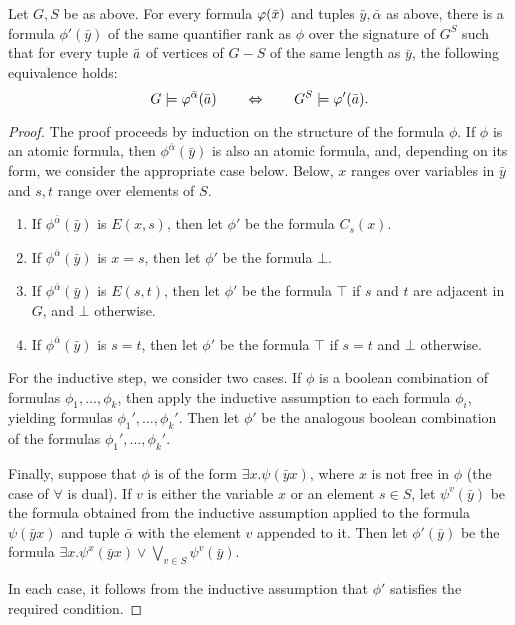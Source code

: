\begin{lemma}\label{lem:remove-s}Let $G,S$ be as above.	
For every formula $\varphi(\bar{x})$ and tuples $\bar y,\bar\alpha$ as above,
there is a formula $\phi'(\bar y)$ 
of the same quantifier rank as $\phi$ over the signature of $G^S$ 
 such that for every tuple $\bar{a}$ of vertices of $G-S$
 of the same length as $\bar y$,
the following equivalence holds:
$$G\models\varphi^{\bar\alpha}(\bar{a})\qquad\Leftrightarrow\qquad G^S\models\varphi'(\bar{a}).$$
\end{lemma}
\begin{proof}
The proof proceeds by induction on the structure of the formula $\phi$. If $\phi$ is an atomic formula,
then $\phi^{\bar \alpha}(\bar y)$ is also an atomic formula, and, depending on its form, 
we consider the appropriate case below. Below, $x$ ranges over variables in $\bar y$
and $s,t$ range over elements of $S$.
\begin{enumerate}
	\item If $\phi^{\bar \alpha}(\bar y)$ is $E(x,s)$, 
then let $\phi'$ be the formula $C_s(x)$.
\item If $\phi^{\bar \alpha}(\bar y)$ is $x=s$, then let $\phi'$
be the formula $\bot$. 
	\item If $\phi^{\bar \alpha}(\bar y)$ is $E(s,t)$, 
then let $\phi'$ be the formula $\top$ if $s$ and $t$ are adjacent in $G$, and $\bot$ otherwise. 
	\item If $\phi^{\bar \alpha}(\bar y)$ is $s=t$, 
then let $\phi'$ be the formula $\top$ if $s=t$ and $\bot$ otherwise. 
\end{enumerate}

For the inductive step, we consider two cases.
If $\phi$ is a boolean combination of formulas $\phi_1,\ldots,\phi_k$, then 
apply the inductive assumption to each formula $\phi_i$,
yielding formulas $\phi_1',\ldots,\phi_k'$. Then let $\phi'$ be the analogous boolean combination of the formulas $\phi_1',\ldots,\phi_k'$.

Finally, suppose that $\phi$ is of the form $\exists x.\psi(\bar y x)$, where $x$ is not free in $\phi$ (the case of $\forall$ is dual). If $v$ is either the variable $x$ 
or an element $s\in S$, 
let $\psi^v(\bar y)$ be the formula obtained from the inductive assumption applied to the formula $\psi(\bar y x)$ 
and tuple $\bar \alpha$ with the element $v$ appended to it.
Then let $\phi'(\bar y)$
be the formula $\exists x.\psi^x(\bar yx)\lor \bigvee_{v\in S}\psi^v(\bar y)$.

In each case, it follows from the inductive assumption that $\phi'$ 
satisfies the required condition.
\end{proof}

